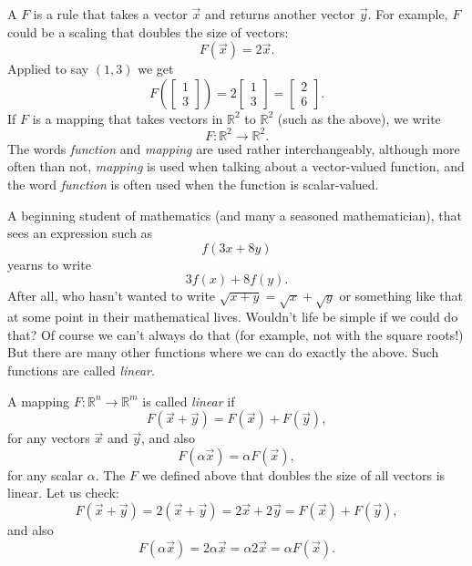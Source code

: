 A \emph{}
$F$ is a rule that takes a vector $\vec{x}$ and returns another vector
$\vec{y}$.  For example, $F$ could be a scaling that doubles the size of
vectors:
\begin{equation*}
F(\vec{x}) = 2 \vec{x} .
\end{equation*}
Applied to say $(1,3)$ we get
\begin{equation*}
F
\left( \begin{bmatrix} 1 \\ 3 \end{bmatrix} \right)
=
2
\begin{bmatrix} 1 \\ 3 \end{bmatrix}
=
\begin{bmatrix} 2 \\ 6 \end{bmatrix} .
\end{equation*}
If $F$ is a mapping that takes vectors in
${\mathbb R}^2$ to 
${\mathbb R}^2$ (such as the above), we write
\begin{equation*}
F \colon {\mathbb R}^2 \to {\mathbb R}^2 .
\end{equation*}
The words \emph{function} and \emph{mapping} are used rather interchangeably,
although more often than not, \emph{mapping} is used when talking about a
vector-valued function, and the word \emph{function} is often used when the
function is scalar-valued.

A beginning student of mathematics (and many a seasoned mathematician),
that
sees an expression such as
\begin{equation*}
f(3x+8y)
\end{equation*}
yearns to write
\begin{equation*}
3f(x)+8f(y) .
\end{equation*}
After all, who hasn't wanted to write $\sqrt{x+y} = \sqrt{x} + \sqrt{y}$ or
something like that at some point in their mathematical lives.
Wouldn't life be simple if we could do that?
Of course we can't always do that (for example, not with the square roots!)
But there are many other functions where
we can do exactly the above.  Such functions are called \emph{linear}.

A mapping $F \colon {\mathbb R}^n \to {\mathbb R}^m$
is called \emph{linear} if
\begin{equation*}
F(\vec{x}+\vec{y}) = F(\vec{x})+F(\vec{y}),
\end{equation*}
for any vectors $\vec{x}$ and $\vec{y}$,
and also
\begin{equation*}
F(\alpha \vec{x}) = \alpha F(\vec{x}) ,
\end{equation*}
for any scalar $\alpha$.
The $F$ we defined above that doubles the size of all vectors is linear.  Let
us check:
\begin{equation*}
F(\vec{x}+\vec{y})
=
2(\vec{x}+\vec{y})
=
2\vec{x}+2\vec{y}
=
F(\vec{x})+F(\vec{y}) ,
\end{equation*}
and also
\begin{equation*}
F(\alpha \vec{x}) = 2 \alpha \vec{x} = \alpha 2 \vec{x} = \alpha F(\vec{x}) .
\end{equation*}

